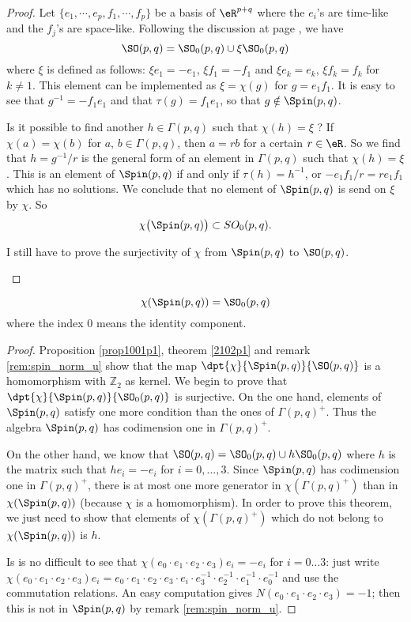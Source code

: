 \begin{proof}
Let $\{ e_1,\cdots,e_p,f_1,\cdots,f_p \}$ be a basis of $\eR^{p+q}$ where the $e_i$'s are time-like and the $f_j$'s are space-like.
Following the discussion at page \pageref{PgDisGeoConnSO}, we have
\[ 
  \SO(p,q)=\SO_0(p,q)\cup\xi \SO_0(p,q)
\]
where $\xi$ is defined as follows: $\xi e_1=-e_1$, $\xi f_1=-f_1$ and $\xi e_k=e_k$, $\xi f_k=f_k$ for $k\neq 1$. This element can be implemented as $\xi=\chi(g)$ for $g=e_1f_1$. It is easy to see that $g^{-1}=-f_1e_1$ and that $\tau(g)=f_1e_1$, so that $g\notin\Spin(p,q)$.

Is it possible to find another $h\in\Gamma(p,q)$ such that $\chi(h)=\xi$ ? If $\chi(a)=\chi(b)$ for $a$, $b\in\Gamma(p,q)$, then $a=rb$ for a certain $r\in\eR$. So we find that $h=g^{-1}/r$ is the general form of an element in $\Gamma(p,q)$ such that $\chi(h)=\xi$. This is an element of $\Spin(p,q)$ if and only if $\tau(h)=h^{-1}$, or $-e_1f_1/r=re_1f_1$ which has no solutions. We conclude that no element of $\Spin(p,q)$ is send on $\xi$ by $\chi$. So
\[ 
  \chi\big( \Spin(p,q) \big)\subset SO_0(p,q).
\]

\begin{probleme}
	I still have to prove the surjectivity of $\chi$ from $\Spin(p,q)$ to $\SO(p,q)$.
\end{probleme}

\end{proof}
\begin{theorem}
\begin{equation}	\label{EqchiSpinSO}	
             \chi(\Spin(p,q))=\SO_0(p,q)
\end{equation} 
where the index $0$ means the identity component.
\end{theorem}

\begin{proof}
Proposition \ref{prop1001p1}, theorem \ref{2102p1} and remark \ref{rem:spin_norm_u} show that the map $\dpt{\chi}{\Spin(p,q)}{\SO(p,q)}$ is a homomorphism with $\mathbb{Z}_2$ as kernel. We begin to prove that $\dpt{\chi}{\Spin(p,q)}{\SO_0(p,q)}$ is surjective. On the one hand, elements of $\Spin(p,q)$ satisfy one more condition than the ones of $\Gamma(p,q)^+$. Thus the algebra $\Spin(p,q)$ has codimension one in $\Gamma(p,q)^+$.

On the other hand, we know that $\SO(p,q)=\SO_0(p,q)\cup h\SO_0(p,q)$ where $h$ is the matrix such that $he_i=-e_i$ for $i=0,\ldots,3$. Since $\Spin(p,q)$ has codimension one in $\Gamma(p,q)^+$, there is at most one more generator in $\chi(\Gamma(p,q)^+)$ than in $\chi(\Spin(p,q))$ (because $\chi$ is a homomorphism). In order to prove this theorem, we just need to show that elements of $\chi(\Gamma(p,q)^+)$ which do not belong to $\chi(\Spin(p,q))$ is $h$.

Is is no difficult to see that $\chi(e_0\cdot e_1\cdot e_2\cdot e_3)e_i=-e_i$ for $i=0\ldots 3$: just write
$\chi(e_0\cdot e_1\cdot e_2\cdot e_3)e_i=e_0\cdot e_1\cdot e_2\cdot e_3\cdot e_i\cdot e_3^{-1}\cdot e_2^{-1}\cdot e_1^{-1}\cdot e_0^{-1}$ and use the commutation relations. An easy computation gives
$N(e_0\cdot e_1\cdot e_2\cdot e_3)=-1$; then this is not in $\Spin(p,q)$ by remark \ref{rem:spin_norm_u}.
\end{proof}

